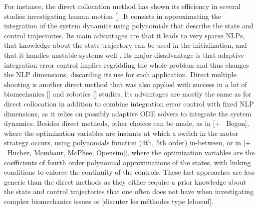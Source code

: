 For instance, the direct collocation method has shown its efficiency in several studies investigating human motion [\addref{}]. 
It consists in approximating the integration of the system dynamics using polynomials that describe the state and control trajectories.
Its main advantages are that it leads to very sparse NLPs, that knowledge about the state trajectory can be used in the initialization, and that it handles unstable systems well \cite{diehl2006fast}. 
Its major disadvantage is that adaptive integration error control implies regridding the whole problem and thus changes the NLP dimensions, discarding its use for such application.
Direct multiple shooting is another direct method that was also applied with success in a lot of biomechanics [\addref] and robotics [\addref] studies.
Its advantages are mostly the same as for direct collocation in addition to combine integration error control with fixed NLP dimensions, as it relies on possibly adaptive ODE solvers to integrate the system dynamics.
Besides direct methods, other choices can be made, as in \cite{yeadon2000mechanics} [+ \addref\ Begon], where the optimization variables are instants at which a switch in the motor strategy occurs, using polynomials function (4th, 5th order) in-between, or in \cite{leboeuf2006energetic} [+ \addref\  Huchez, Mombaur, McPhee, Opensim]], where the optimization variables are the coefficients of fourth order polynomial approximations of the states, with linking conditions to enforce the continuity of the controls. 
These last approaches are less generic than the direct methods as they either require a prior knowledge about the state and control trajectories that one often does not have when investigating complex biomechanics issues or [discuter les méthodes type leboeuf]. 


